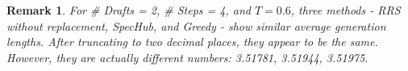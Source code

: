 \documentclass{article}
\newtheorem{remark}[theorem]{Remark}
\begin{document}
\begin{table}[ht]
{\begin{tabular}{lcccccc}
\bottomrule
\end{tabular} }
\end{table}

\begin{remark}
For \# Drafts = 2, \# Steps = 4, and $T=0.6$, three methods - RRS without replacement, SpecHub, and Greedy - show similar average generation lengths. After truncating to two decimal places, they appear to be the same. However, they are actually different numbers: 3.51781, 3.51944, 3.51975.
\end{remark}
  
\end{document}
